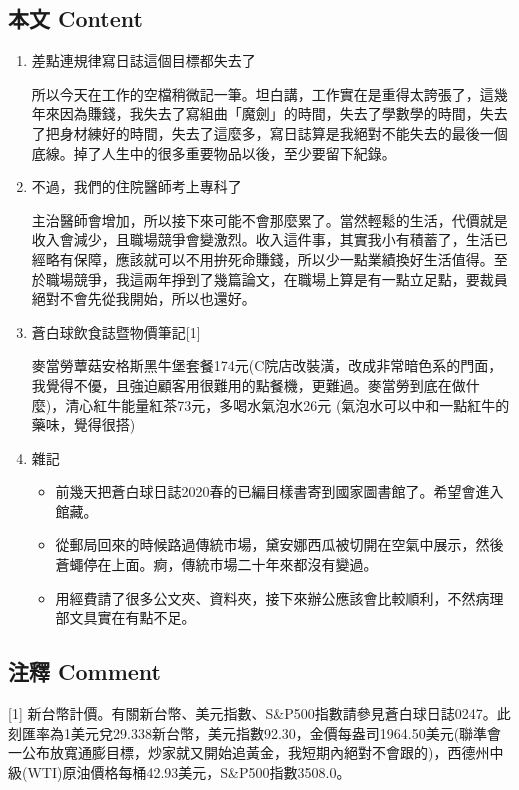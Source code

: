 \documentclass[a5paper, 11pt
]{book}
\providecommand{\tightlist}{%
  \setlength{\itemsep}{0pt}\setlength{\parskip}{0pt}}
\begin{document}
\hypertarget{ux672cux6587-content-75}{%
\subsection{本文 Content}\label{ux672cux6587-content-75}}

\begin{enumerate}
\def\labelenumi{\arabic{enumi}.}
\item
  差點連規律寫日誌這個目標都失去了

  所以今天在工作的空檔稍微記一筆。坦白講，工作實在是重得太誇張了，這幾年來因為賺錢，我失去了寫組曲「魔劍」的時間，失去了學數學的時間，失去了把身材練好的時間，失去了這麼多，寫日誌算是我絕對不能失去的最後一個底線。掉了人生中的很多重要物品以後，至少要留下紀錄。
\item
  不過，我們的住院醫師考上專科了

  主治醫師會增加，所以接下來可能不會那麼累了。當然輕鬆的生活，代價就是收入會減少，且職場競爭會變激烈。收入這件事，其實我小有積蓄了，生活已經略有保障，應該就可以不用拚死命賺錢，所以少一點業績換好生活值得。至於職場競爭，我這兩年掙到了幾篇論文，在職場上算是有一點立足點，要裁員絕對不會先從我開始，所以也還好。
\item
  蒼白球飲食誌暨物價筆記{[}1{]}

  麥當勞蕈菇安格斯黑牛堡套餐174元(C院店改裝潢，改成非常暗色系的門面，我覺得不優，且強迫顧客用很難用的點餐機，更難過。麥當勞到底在做什麼)，清心紅牛能量紅茶73元，多喝水氣泡水26元
  (氣泡水可以中和一點紅牛的藥味，覺得很搭)
\item
  雜記

  \begin{itemize}
  \tightlist
  \item
    前幾天把蒼白球日誌2020春的已編目樣書寄到國家圖書館了。希望會進入館藏。
  \item
    從郵局回來的時候路過傳統市場，黛安娜西瓜被切開在空氣中展示，然後蒼蠅停在上面。痾，傳統市場二十年來都沒有變過。
  \item
    用經費請了很多公文夾、資料夾，接下來辦公應該會比較順利，不然病理部文具實在有點不足。
  \end{itemize}
\end{enumerate}

\hypertarget{ux6ce8ux91cb-comment-75}{%
\subsection{注釋 Comment}\label{ux6ce8ux91cb-comment-75}}

{[}1{]}
新台幣計價。有關新台幣、美元指數、S\&P500指數請參見蒼白球日誌0247。此刻匯率為1美元兌29.338新台幣，美元指數92.30，金價每盎司1964.50美元(聯準會一公布放寬通膨目標，炒家就又開始追黃金，我短期內絕對不會跟的)，西德州中級(WTI)原油價格每桶42.93美元，S\&P500指數3508.0。
\end{document}
